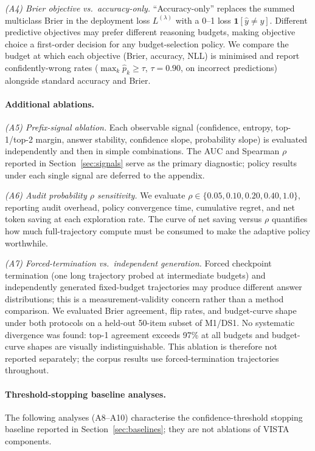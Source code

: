 \documentclass[a4paper,fleqn]{cas-sc}
\newcommand{\lossfn}{L}
\theoremstyle{plain}
\theoremstyle{definition}
\theoremstyle{remark}
\begin{document}
\emph{(A4) Brier objective vs.\ accuracy-only.}
``Accuracy-only'' replaces the summed multiclass Brier in the deployment loss
$\lossfn^{(\lambda)}$ with a 0--1 loss $\mathbf{1}[\hat{y}\neq y]$.
Different predictive objectives may prefer different reasoning budgets,
making objective choice a first-order decision for any budget-selection policy.
We compare the budget at which each objective (Brier, accuracy, NLL) is
minimised and report confidently-wrong rates
($\max_k \hat{p}_k \geq \tau$, $\tau=0.90$, on incorrect predictions)
alongside standard accuracy and Brier.

\paragraph{Additional ablations.}
\emph{(A5) Prefix-signal ablation.}
Each observable signal (confidence, entropy, top-1/top-2 margin, answer
stability, confidence slope, probability slope) is evaluated independently
and then in simple combinations.
The AUC and Spearman $\rho$ reported in Section~\ref{sec:signals}
serve as the primary diagnostic; policy results
under each single signal are deferred to the appendix.

\emph{(A6) Audit probability $\rho$ sensitivity.}
We evaluate $\rho\in\{0.05,0.10,0.20,0.40,1.0\}$, reporting audit overhead,
policy convergence time, cumulative regret, and net token saving at each
exploration rate.
The curve of net saving versus $\rho$ quantifies how much full-trajectory
compute must be consumed to make the adaptive policy worthwhile.

\emph{(A7) Forced-termination vs.\ independent generation.}
Forced checkpoint termination (one long trajectory probed at intermediate
budgets) and independently generated fixed-budget trajectories may produce
different answer distributions; this is a measurement-validity concern
rather than a method comparison.
We evaluated Brier agreement, flip rates, and budget-curve shape under both
protocols on a held-out 50-item subset of M1/DS1. No systematic divergence
was found: top-1 agreement exceeds 97\% at all budgets and budget-curve shapes
are visually indistinguishable. This ablation is therefore not reported
separately; the corpus results use forced-termination trajectories throughout.

\paragraph{Threshold-stopping baseline analyses.}
The following analyses (A8--A10) characterise the confidence-threshold
stopping baseline reported in Section~\ref{sec:baselines}; they are not
ablations of VISTA components.
\end{document}
